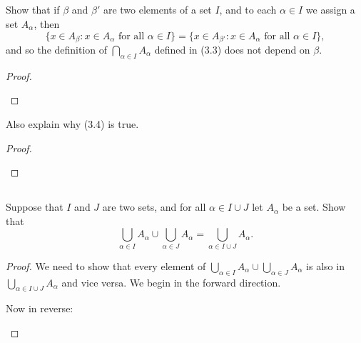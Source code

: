 \documentclass[../../main.tex]{subfiles}
\begin{document}
\addtocounter{subsection}{1}
\subsection{}
\begin{q}
    Show that if $\beta$ and $\beta'$ are two elements of a set $I$, and to each $\alpha \in I$ we assign a set $A_\alpha$, then \[
        \{
            x \in A_\beta : x \in A_\alpha \text{ for all } \alpha \in I
        \} = 
        \{
            x \in A_{\beta'} : x \in A_\alpha \text{ for all } \alpha \in I
        \},
    \]
    and so the definition of $\bigcap_{\alpha \in I} A_\alpha$ defined in (3.3) does not depend on $\beta$. 
\end{q}

\begin{proof}
    
    \begin{xx}
        
    \end{xx}
\end{proof}

\begin{q}
    Also explain why (3.4) is true.
\end{q}

\begin{proof}
    
    \begin{xx}
        
    \end{xx}
\end{proof}

\subsection{}
\begin{q}
    Suppose that $I$ and $J$ are two sets, and for all $\alpha \in I \cup J$ let $A_\alpha$ be a set. Show that
    \[\bigcup_{\alpha \in I} A_\alpha \cup \bigcup_{\alpha \in J} A_\alpha = \bigcup_{\alpha \in I \cup J} A_\alpha.\]
\end{q}

    \begin{proof}
    We need to show that every element of $\bigcup_{\alpha \in I} A_\alpha \cup \bigcup_{\alpha \in J} A_\alpha$ is also in $\bigcup_{\alpha \in I \cup J} A_\alpha$ and vice versa. We begin in the forward direction.
        \begin{xx}
        \begin{linebyline}
            \item
        \end{linebyline}
    Now in reverse:
        \begin{linebyline}
            \item
        \end{linebyline}
        \end{xx}
    \end{proof}
\end{document}
